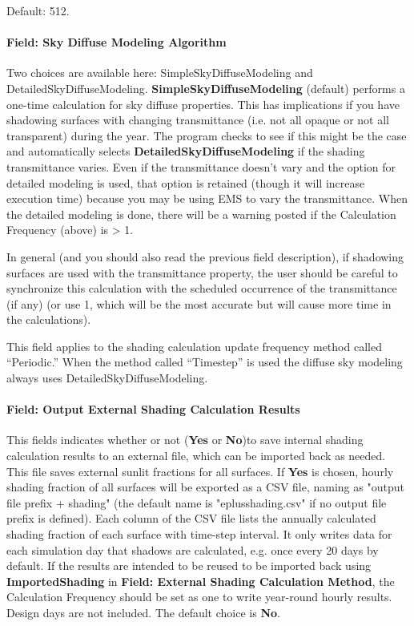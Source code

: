 Default: 512.

\paragraph{Field: Sky Diffuse Modeling Algorithm}\label{field-sky-diffuse-modeling-algorithm}

Two choices are available here: SimpleSkyDiffuseModeling and DetailedSkyDiffuseModeling. \textbf{SimpleSkyDiffuseModeling} (default) performs a one-time calculation for sky diffuse properties. This has implications if you have shadowing surfaces with changing transmittance (i.e. not all opaque or not all transparent) during the year. The program checks to see if this might be the case and automatically selects \textbf{DetailedSkyDiffuseModeling} if the shading transmittance varies. Even if the transmittance doesn't vary and the option for detailed modeling is used, that option is retained (though it will increase execution time) because you may be using EMS to vary the transmittance. When the detailed modeling is done, there will be a warning posted if the Calculation Frequency (above) is \textgreater{} 1.

In general (and you should also read the previous field description), if shadowing surfaces are used with the transmittance property, the user should be careful to synchronize this calculation with the scheduled occurrence of the transmittance (if any) (or use 1, which will be the most accurate but will cause more time in the calculations).

This field applies to the shading calculation update frequency method called ``Periodic.'' When the method called ``Timestep'' is used the diffuse sky modeling always uses DetailedSkyDiffuseModeling.

\paragraph{Field: Output External Shading Calculation Results}\label{field-output-external-shading-calculation results}
This fields indicates whether or not (\textbf{Yes} or \textbf{No})to save internal shading calculation results to an external file, which can be imported back as needed. This file saves external sunlit fractions for all surfaces. If \textbf{Yes} is chosen, hourly shading fraction of all surfaces will be exported as a CSV file, naming as "output file prefix + shading" (the default name is "eplusshading.csv" if no output file prefix is defined). Each column of the CSV file lists the annually calculated shading fraction of each surface with time-step interval. It only writes data for each simulation day that shadows are calculated, e.g. once every 20 days by default. If the results are intended to be reused to be imported  back using \textbf{ImportedShading} in \textbf{Field: External Shading Calculation Method}, the Calculation Frequency should be set as one to write year-round hourly results. Design days are not included. The default choice is \textbf{No}.

